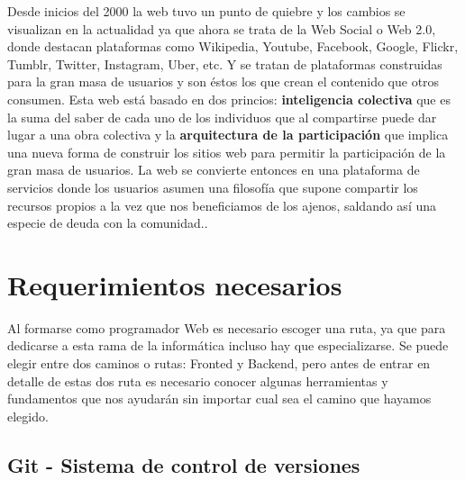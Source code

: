 \documentclass[twocolumns,a4paper]{IEEEtran}
\begin{document}
Desde inicios del 2000 la web tuvo un punto
de quiebre y los cambios se visualizan en la actualidad ya que ahora se trata
de la Web Social o Web 2.0, donde destacan plataformas como Wikipedia, Youtube,
Facebook, Google, Flickr, Tumblr, Twitter, Instagram, Uber, etc. Y se tratan de
plataformas construidas para la gran masa de usuarios y son éstos los que crean
el contenido que otros consumen. Esta web está basado en dos princios:
\textbf{inteligencia colectiva} que es la suma del saber de cada uno de los
individuos que al compartirse puede dar lugar a una obra colectiva y la
\textbf{arquitectura de la participación} que implica una nueva forma de
construir los sitios web para permitir la participación de la gran masa de
usuarios. La web se convierte entonces en una plataforma de servicios donde los
usuarios asumen una filosofía que supone compartir los recursos propios a la
vez que nos beneficiamos de los ajenos, saldando así una especie de deuda con
la comunidad.\cite{NataliaVazquezWeb2007}.
\newline























\section{Requerimientos necesarios}
Al formarse como programador Web es necesario escoger una ruta, ya que para
dedicarse a esta rama de la informática incluso hay que especializarse. Se
puede elegir entre dos caminos o rutas: Fronted y Backend, pero antes de entrar
en detalle de estas dos ruta es necesario conocer algunas herramientas y
fundamentos que nos ayudarán sin importar cual sea el camino que hayamos
elegido.
\subsection{Git - Sistema de control de versiones}
\cite{pascual199012}\cite{mycite2016}\cite{Chavez-Campos2016}\cite{webdev:2018:online}\cite{SergioLujan2001}\cite{NataliaVazquezWeb2007}\cite{WebDev:2018:online}\cite{ScottBenGit2014}\cite{Ssh:2018:online}\cite{HTTP:2018:online}\cite{HTTPS:2018:online}\cite{ChrisNegusLinux2005}\cite{JoyanesProg2008}\cite{GuidesGitHub:2018:online}\cite{HTMLw3:2018:online}\cite{PluralsightJavaScript:2018:online}\cite{JavaScriptw3:2018:online}\cite{PythonTuto:2018:online}\cite{IntroPython2008}


\printbibliography
\end{document}
